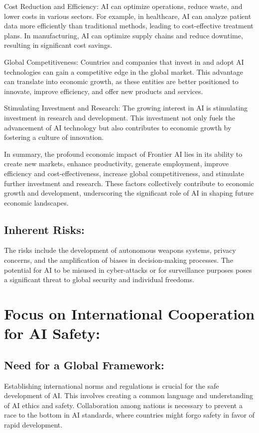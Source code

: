 \documentclass{article}
\begin{document}
Cost Reduction and Efficiency: AI can optimize operations, reduce waste, and lower costs in various sectors. For example, in healthcare, AI can analyze patient data more efficiently than traditional methods, leading to cost-effective treatment plans. In manufacturing, AI can optimize supply chains and reduce downtime, resulting in significant cost savings.

Global Competitiveness: Countries and companies that invest in and adopt AI technologies can gain a competitive edge in the global market. This advantage can translate into economic growth, as these entities are better positioned to innovate, improve efficiency, and offer new products and services.

Stimulating Investment and Research: The growing interest in AI is stimulating investment in research and development. This investment not only fuels the advancement of AI technology but also contributes to economic growth by fostering a culture of innovation.

In summary, the profound economic impact of Frontier AI lies in its ability to create new markets, enhance productivity, generate employment, improve efficiency and cost-effectiveness, increase global competitiveness, and stimulate further investment and research. These factors collectively contribute to economic growth and development, underscoring the significant role of AI in shaping future economic landscapes.

\subsection{Inherent Risks:}
The risks include the development of autonomous weapons systems, privacy concerns, and the amplification of biases in decision-making processes. The potential for AI to be misused in cyber-attacks or for surveillance purposes poses a significant threat to global security and individual freedoms.

\section{Focus on International Cooperation for AI Safety:}
\subsection{Need for a Global Framework:}
Establishing international norms and regulations is crucial for the safe development of AI. This involves creating a common language and understanding of AI ethics and safety. Collaboration among nations is necessary to prevent a race to the bottom in AI standards, where countries might forgo safety in favor of rapid development.
\end{document}
